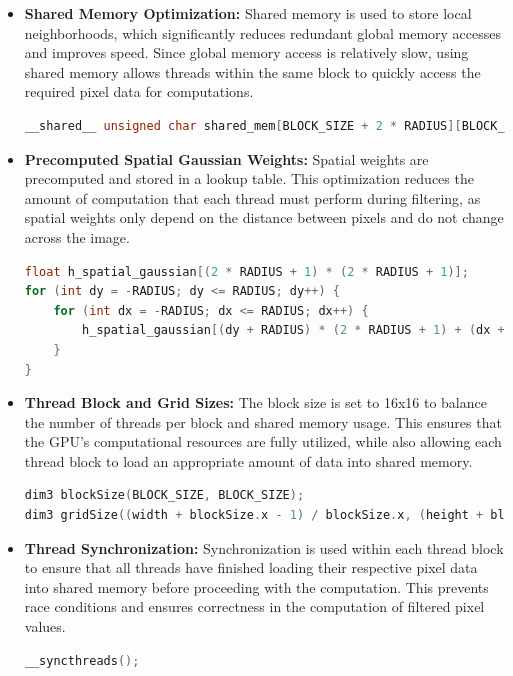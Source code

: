 \documentclass[12pt,a4paper]{report}
\begin{document}
\begin{itemize}
\item \textbf{Shared Memory Optimization:} Shared memory is used to store local neighborhoods, which significantly reduces redundant global memory accesses and improves speed. Since global memory access is relatively slow, using shared memory allows threads within the same block to quickly access the required pixel data for computations.
\begin{lstlisting}[language=c++]
__shared__ unsigned char shared_mem[BLOCK_SIZE + 2 * RADIUS][BLOCK_SIZE + 2 * RADIUS][3];
\end{lstlisting}
\item \textbf{Precomputed Spatial Gaussian Weights:} Spatial weights are precomputed and stored in a lookup table. This optimization reduces the amount of computation that each thread must perform during filtering, as spatial weights only depend on the distance between pixels and do not change across the image.
\begin{lstlisting}[language=c++]
float h_spatial_gaussian[(2 * RADIUS + 1) * (2 * RADIUS + 1)];
for (int dy = -RADIUS; dy <= RADIUS; dy++) {
    for (int dx = -RADIUS; dx <= RADIUS; dx++) {
        h_spatial_gaussian[(dy + RADIUS) * (2 * RADIUS + 1) + (dx + RADIUS)] = gaussian(sqrtf(dx * dx + dy * dy), SIGMA_S);
    }
}
\end{lstlisting}
\item \textbf{Thread Block and Grid Sizes:} The block size is set to 16x16 to balance the number of threads per block and shared memory usage. This ensures that the GPU's computational resources are fully utilized, while also allowing each thread block to load an appropriate amount of data into shared memory.
\begin{lstlisting}[language=c++]
dim3 blockSize(BLOCK_SIZE, BLOCK_SIZE);
dim3 gridSize((width + blockSize.x - 1) / blockSize.x, (height + blockSize.y - 1) / blockSize.y);
\end{lstlisting}
\item \textbf{Thread Synchronization:} Synchronization is used within each thread block to ensure that all threads have finished loading their respective pixel data into shared memory before proceeding with the computation. This prevents race conditions and ensures correctness in the computation of filtered pixel values.
\begin{lstlisting}[language=c++]
__syncthreads();
\end{lstlisting}
\end{itemize}
\end{document}
